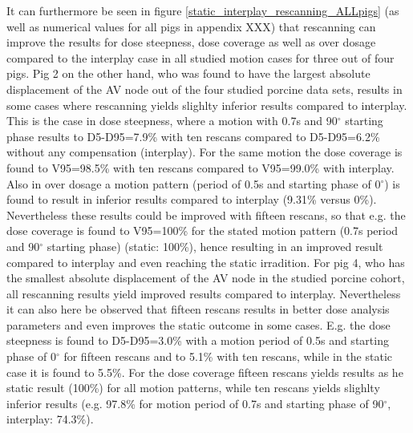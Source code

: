 \documentclass[type=dr, dr=rernat, accentcolor=tud7b,colorbacktitle, bigchapter, openright, twoside, 12pt ]{tudthesis}
\begin{document}
\newline
It can furthermore be seen in figure \ref{static_interplay_rescanning_ALLpigs} (as well as numerical values for all pigs in appendix XXX) 
that rescanning can improve the results for dose steepness, dose coverage as well as over dosage compared to the interplay case in all studied 
motion cases for three out of four pigs. Pig 2 on the other hand, who was found to have the largest absolute displacement of the AV node out of 
the four studied porcine data sets, results in some cases where rescanning yields slighlty inferior results compared to interplay. This is the 
case in dose steepness, where a motion with 0.7s and 90$^{\circ}$ starting phase results to D5-D95=7.9\% with ten rescans compared to 
D5-D95=6.2\% without any compensation (interplay). For the same motion the dose coverage is found to V95=98.5\% with ten rescans compared to 
V95=99.0\% with interplay. Also in over dosage a motion pattern (period of 0.5s and starting phase of 0$^{\circ}$) is found to result in 
inferior results compared to interplay (9.31\% versus 0\%). Nevertheless these results could be improved with fifteen rescans, so that e.g. 
the dose coverage is found to V95=100\% for the stated motion pattern (0.7s period and 90$^{\circ}$ starting phase) (static: 100\%), 
hence resulting in an improved result compared to interplay and even reaching the static irradition. 
For pig 4, who has the smallest absolute displacement of the AV node in the studied porcine cohort, all rescanning results yield 
improved results compared to interplay. Nevertheless it can also here be observed that fifteen rescans results in better dose analysis parameters 
and even improves the static outcome in some cases. E.g. the dose steepness is found to D5-D95=3.0\% with a motion period of 0.5s and starting 
phase of 0$^{\circ}$ for fifteen rescans and to 5.1\% with ten rescans, while in the static case it is found to 5.5\%. 
For the dose coverage fifteen rescans yields results as he static result (100\%) for all motion patterns, while ten rescans yields 
slighlty inferior results (e.g. 97.8\% for motion period of 0.7s and starting phase of 90$^{\circ}$, interplay: 74.3\%).\newline  
\end{document}
